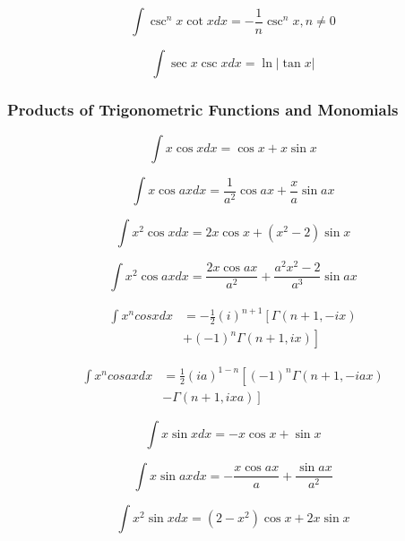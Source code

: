 \documentclass[11pt, letterpaper, notitlepage]{article}
\begin{document}
\begin{multicols}{2}
\begin{footnotesize}
\begin{equation}
\int \csc^nx \cot x dx = -\frac{1}{n}\csc^n x, n\ne 0
\end{equation}

\begin{equation}
\int \sec x \csc x dx = \ln | \tan x | 
\end{equation}


\subsubsection{Products of Trigonometric Functions and Monomials}

\begin{equation}
\int x \cos x dx = \cos x + x \sin x 
\end{equation}

\begin{equation}
\int x \cos ax dx = \frac{1}{a^2} \cos ax + \frac{x}{a} \sin ax 
\end{equation}

\begin{equation}
\int x^2 \cos x dx = 2 x \cos x + \left ( x^2 - 2 \right ) \sin x 
\end{equation}

\begin{equation}
\int x^2 \cos ax dx = \frac{2 x \cos ax }{a^2} + \frac{ a^2 x^2 - 2  }{a^3} \sin ax 
\end{equation}

\begin{align}
\int  x^n cos x dx &= 
-\frac{1}{2}(i)^{n+1}\left [ \Gamma(n+1, -ix) 
\right . \nonumber \\ & \left .
+ (-1)^n \Gamma(n+1, ix)\right] 
\end{align}

\begin{align}
\int x^n cos ax dx &=
 \frac{1}{2}(ia)^{1-n}\left [ (-1)^n  \Gamma(n+1, -iax) 
 \right. \nonumber \\ & \left.
 -\Gamma(n+1, ixa)\right] 
\end{align}

\begin{equation}
\int x \sin x dx = -x \cos x + \sin x 
\end{equation}

\begin{equation}
\int x \sin ax dx = -\frac{x \cos ax}{a} + \frac{\sin ax}{a^2} 
\end{equation}

\begin{equation}
\int x^2 \sin x dx = \left(2-x^2\right) \cos x + 2 x \sin x
\end{equation}


\end{footnotesize}
\end{multicols}
\end{document}
